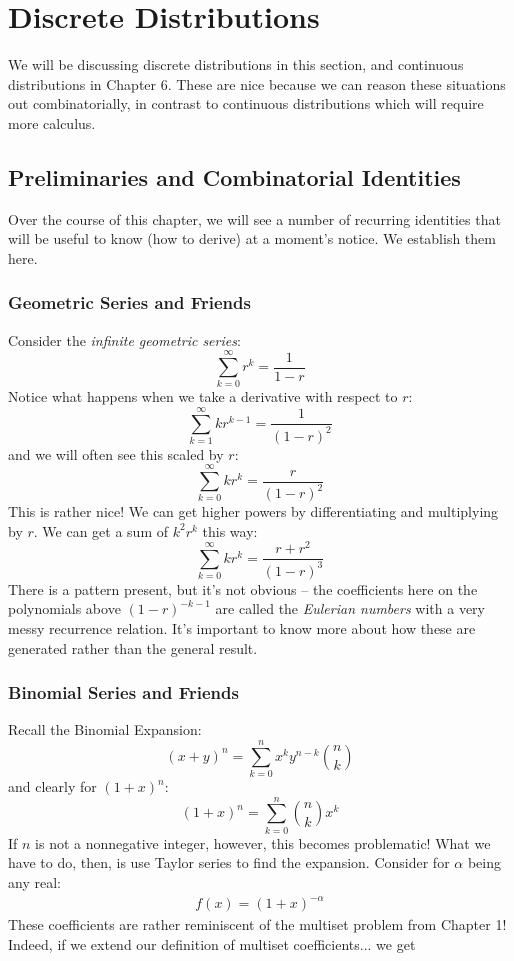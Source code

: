 \documentclass[../main.tex]{subfiles}
\begin{document}
\chapter{Discrete Distributions}
We will be discussing discrete distributions in this section, and continuous distributions in Chapter 6. These are nice because we can reason these situations out combinatorially, in contrast to continuous distributions which will require more calculus. 
\section{Preliminaries and Combinatorial Identities}
Over the course of this chapter, we will see a number of recurring identities that will be useful to know (how to derive) at a moment's notice. We establish them here. 
\subsection{Geometric Series and Friends}
Consider the \textit{infinite geometric series}: 
\[
    \sum_{k=0}^\infty r^k = \frac{1}{1-r}
\]
Notice what happens when we take a derivative with respect to $r$: 
\[
    \sum_{k=1}^\infty kr^{k-1} = \frac{1}{(1-r)^2}
\]  
and we will often see this scaled by $r$: 
\[
    \sum_{k=0}^\infty kr^k = \frac{r}{(1-r)^2}
\]  
This is rather nice! We can get higher powers by differentiating and multiplying by $r$. We can get a sum of $k^2 r^k$ this way: 
\[
    \sum_{k=0}^\infty kr^k = \frac{r+r^2}{(1-r)^3}
\]
There is a pattern present, but it's not obvious -- the coefficients here on the polynomials above $(1-r)^{-k-1}$ are called the \textit{Eulerian numbers} with a very messy recurrence relation. It's important to know more about how these are generated rather than the general result.

\subsection{Binomial Series and Friends}
Recall the Binomial Expansion: 
\[
    (x+y)^n = \sum_{k=0}^n x^k y^{n-k} \binom{n}{k}
\]
and clearly for $(1+x)^n$:
\[
(1+x)^n = \sum_{k=0}^n\binom{n}{k} x^k
\]
If $n$ is not a nonnegative integer, however, this becomes problematic! What we have to do, then, is use Taylor series to find the expansion. Consider for $\alpha$ being any real: 
\begin{align*}
    f(x) = (1+x)^{-\alpha}
\end{align*}
These coefficients are rather reminiscent of the multiset problem from Chapter 1! Indeed, if we extend our definition of multiset coefficients... we get %
\end{document}
